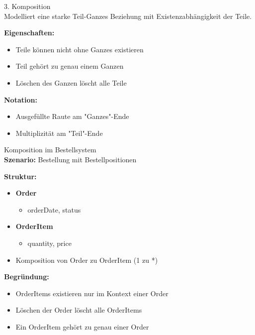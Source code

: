\begin{concept}{3. Komposition}\\
Modelliert eine starke Teil-Ganzes Beziehung mit Existenzabhängigkeit der Teile.

\textbf{Eigenschaften:}
\begin{itemize}
    \item Teile können nicht ohne Ganzes existieren
    \item Teil gehört zu genau einem Ganzen
    \item Löschen des Ganzen löscht alle Teile
\end{itemize}

\textbf{Notation:}
\begin{itemize}
    \item Ausgefüllte Raute am "Ganzes"-Ende
    \item Multiplizität am "Teil"-Ende
\end{itemize}
\end{concept}

\begin{example2}{Komposition im Bestellsystem}\\
\textbf{Szenario:} Bestellung mit Bestellpositionen

\textbf{Struktur:}
\begin{itemize}
    \item \textbf{Order}
    \begin{itemize}
        \item orderDate, status
    \end{itemize}
    \item \textbf{OrderItem}
    \begin{itemize}
        \item quantity, price
    \end{itemize}
    \item Komposition von Order zu OrderItem (1 zu *)
\end{itemize}

\textbf{Begründung:}
\begin{itemize}
    \item OrderItems existieren nur im Kontext einer Order
    \item Löschen der Order löscht alle OrderItems
    \item Ein OrderItem gehört zu genau einer Order
\end{itemize}
\end{example2}

